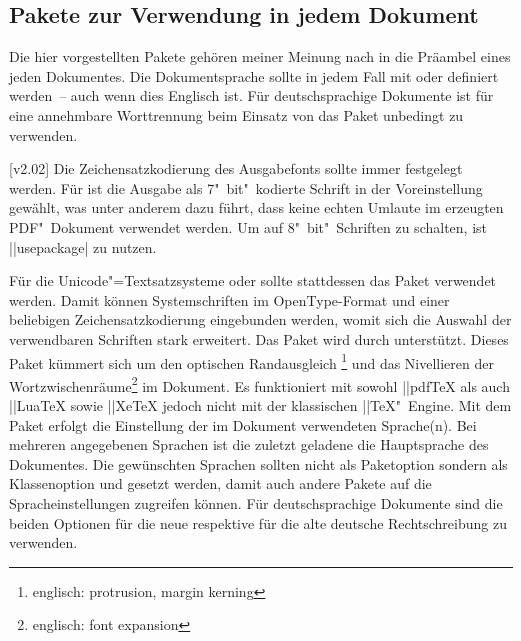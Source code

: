 \subsection{Pakete zur Verwendung in jedem Dokument}
%
Die hier vorgestellten Pakete gehören meiner Meinung nach in die Präambel eines 
jeden Dokumentes. Die Dokumentsprache sollte in jedem Fall mit  
oder  definiert werden~-- auch wenn dies Englisch ist. Für 
deutschsprachige Dokumente ist für eine annehmbare Worttrennung beim Einsatz 
von  das Paket  unbedingt zu verwenden.

\begin{DeclarePackages}
[v2.02]
  Die Zeichensatzkodierung des Ausgabefonts sollte immer festgelegt werden. Für 
   ist die Ausgabe als 7"~bit"~kodierte Schrift in der 
  Voreinstellung gewählt, was unter anderem dazu führt, dass keine echten
  Umlaute im erzeugten PDF"~Dokument verwendet werden. Um auf 8"~bit"~Schriften
  zu schalten, ist \Macro||{usepackage|} zu
  nutzen.
  
  Für die Unicode"=Textsatzsysteme  oder  
  sollte stattdessen das Paket  verwendet werden. Damit 
  können Systemschriften im OpenType-Format und einer beliebigen 
  Zeichensatzkodierung eingebunden werden, womit sich die Auswahl der 
  verwendbaren Schriften stark erweitert. Das Paket wird durch \TUDScript 
  unterstützt.
  Dieses Paket kümmert sich um den optischen Randausgleich%
  \footnote{englisch: protrusion, margin kerning} und das Nivellieren der 
  Wortzwischenräume\footnote{englisch: font expansion} im Dokument. Es 
  funktioniert mit sowohl \Format||{pdfTeX} als auch \Format||{LuaTeX} sowie 
  \Format||{XeTeX} jedoch nicht mit der klassischen \Format||{TeX}"~Engine.
  Mit dem Paket  erfolgt die Einstellung der im Dokument 
  verwendeten Sprache(n). Bei mehreren angegebenen Sprachen ist die zuletzt 
  geladene die Hauptsprache des Dokumentes. Die gewünschten Sprachen sollten 
  nicht als Paketoption sondern als Klassenoption und gesetzt werden, damit 
  auch andere Pakete auf die Spracheinstellungen zugreifen können. Für 
  deutschsprachige Dokumente sind die beiden Optionen  für die 
  neue respektive  für die alte deutsche Rechtschreibung zu 
  verwenden. 
  

\end{DeclarePackages}
